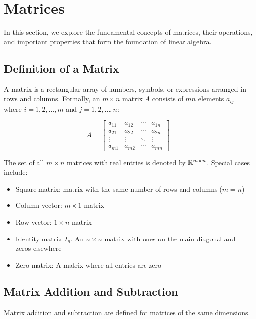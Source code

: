 \newpage
\section{Matrices}

In this section, we explore the fundamental concepts of matrices, their operations, and important properties that form the foundation of linear algebra.

\subsection{Definition of a Matrix}

A matrix is a rectangular array of numbers, symbols, or expressions arranged in rows and columns. Formally, an \(m \times n\) matrix \(A\) consists of \(mn\) elements \(a_{ij}\) where \(i = 1, 2, \ldots, m\) and \(j = 1, 2, \ldots, n\):

\[
    A = 
    \begin{bmatrix}
    a_{11} & a_{12} & \cdots & a_{1n} \\
    a_{21} & a_{22} & \cdots & a_{2n} \\
    \vdots & \vdots & \ddots & \vdots \\
    a_{m1} & a_{m2} & \cdots & a_{mn}
    \end{bmatrix}
\]

The set of all \(m \times n\) matrices with real entries is denoted by \(\mathbb{R}^{m \times n}\). Special cases include:

\begin{itemize}
    \item Square matrix: matrix with the same number of rows and columns (\(m = n\))
    \item Column vector: \(m \times 1\) matrix
    \item Row vector: \(1 \times n\) matrix
    \item Identity matrix \(I_n\): An \(n \times n\) matrix with ones on the main diagonal and zeros elsewhere
    \item Zero matrix: A matrix where all entries are zero
\end{itemize}

\subsection{Matrix Addition and Subtraction}

Matrix addition and subtraction are defined for matrices of the same dimensions.

